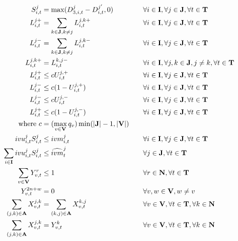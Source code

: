 \documentclass[11pt,letter]{article}
\begin{document}
\begin{align}
S_{i,t}^{j} & = \max(D_{3,i,t}^{j}-D_{i,t}^{j{'}},0) && \quad \forall i\in \textbf{I},\forall j\in \textbf{J}, \forall t \in \textbf{T} \label{eq:max4}\\
L_{i,t}^{j{+}} & = \sum_{k\in \textbf{J},k\neq j}L_{i,t}^{j,k{+}} && \quad \forall i\in \textbf{I},\forall j\in \textbf{J}, \forall t \in \textbf{T} \label{eq:Fig2_1}\\
L_{i,t}^{j{-}} & = \sum_{k\in \textbf{J},k\neq j}L_{i,t}^{j,k{-}} && \quad \forall i\in \textbf{I},\forall j\in \textbf{J}, \forall t \in \bf{T} \label{eq:Fig2_2}\\
L_{i,t}^{j,k{+}} & = L_{i,t}^{k,j{-}} && \quad \forall i\in \textbf{I},\forall j,k\in \textbf{J}, j\neq k, \forall t \in \textbf{T}\\
L_{i,t}^{j{+}} & \leq c U_{i,t}^{j,{+}} && \quad \forall i\in \textbf{I},\forall j\in \textbf{J}, \forall t \in \textbf{T}\\
L_{i,t}^{j{-}} & \leq c (1-U_{i,t}^{j,{+}}) && \quad \forall i\in \textbf{I},\forall j\in \textbf{J}, \forall t \in \textbf{T}\\
L_{i,t}^{j{-}} & \leq c U_{i,t}^{j,{-}} && \quad \forall i\in \textbf{I},\forall j\in \textbf{J}, \forall t \in \textbf{T}\\
L_{i,t}^{j{+}} & \leq c (1-U_{i,t}^{j,{-}}) && \quad \forall i\in \textbf{I},\forall j\in \textbf{J}, \forall t \in \textbf{T}\\
\text{where } c & = (\max_{v\in \textbf{V}} q_v)\min(|\textbf{J}|-1,|\textbf{V}|) && \nonumber \\
ivu_{i,t}^{j} S_{i,t}^{j} & \leq ivm_{i,t}^{j} && \quad \forall i\in \textbf{I},\forall j\in \textbf{J}, \forall t \in \textbf{T}  \\
\sum_{i \in \textbf{I}} ivu_{i,t}^{j} S_{i,t}^{j} & \leq \widehat{ivm}_{t}^{j} && \quad \forall j\in \textbf{J}, \forall t \in \textbf{T} \\
\sum_{v\in \textbf{V}} Y_{v,t}^{r} & \leq 1 && \quad \forall r \in \textbf{N}, \forall t \in \textbf{T} \\
Y_{v,t}^{2n+w} & = 0 && \quad \forall v,w \in \textbf{V}, w \neq v \\
\sum_{(j,k)\in \textbf{A}} X_{v,t}^{j,k} & = \sum_{(k,j)\in \textbf{A}} X_{v,t}^{k,j} && \quad \forall v \in \textbf{V}, \forall t \in \textbf{T}, \forall k \in \textbf{N} \\
\sum_{(j,k)\in \textbf{A}} X_{v,t}^{j,k} & = Y_{v,t}^{k} && \quad \forall v \in \textbf{V}, \forall t \in \textbf{T}, \forall k \in \textbf{N}\\

\end{align}
\end{document}
